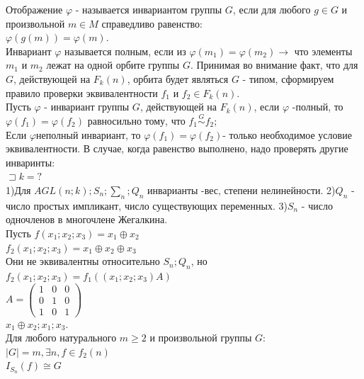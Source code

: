 \opr 
Отображение $\varphi$ - называется инвариантом группы $G$, если для любого $g \in G$ и произвольной $m \in M$ справедливо равенство:\\
$\varphi(g(m))=\varphi(m)$.\\
Инвариант $\varphi$ называется полным, если из $\varphi (m_1) = \varphi(m_2) \rightarrow $ что элементы $m_1 $ и $m_2$ лежат на одной орбите группы $G$. Принимая во внимание факт, что для $G$, действующей на $F_k(n)$, орбита будет являться $G$ - типом, сформируем правило проверки эквивалентности $f_1 $ и $f_2 \in F_k(n)$.\\
Пусть $\varphi$ - инвариант группы $G$, действующей на $F_k(n)$, если $\varphi$ -полный, то $\varphi(f_1)=\varphi(f_2) $ равносильно тому, что $f_1 \stackrel{G}{\sim} f_2$;\\
Если $\varphi$неполный инвариант, то $\varphi(f_1)=\varphi(f_2) $- только необходимое условие эквивалентности. В случае, когда равенство выполнено, надо проверять другие инваринты:\\

$\sqsupset k = ?$\\
1)Для $AGL(n;k); S_n; \sum_n; Q_n $ инварианты -вес, степени нелинейности.
2)$Q_n$ - число простых импликант, число существующих переменных.
3)$S_n$ - число одночленов в многочлене Жегалкина.\\


\example 
Пусть $f(x_1;x_2;x_3)=x_1\oplus x_2$\\
$f_2(x_1;x_2;x_3)=x_1 \oplus x_2 \oplus x_3$ \\
Они не эквивалентны относительно $S_n;Q_n$, но
$f_2(x_1;x_2;x_3)=f_1((x_1;x_2;x_3)A)$\\



$A=
\begin{pmatrix}
  1 & 0 & 0\\
  0 & 1 & 0\\
  1 & 0 & 1
  
  
\end{pmatrix}$\\

$x_1 \oplus x_2;x_1;x_3$.\\


\thr
Для любого натурального $ m \geqslant 2$ и произвольной группы $G$:
$|G|=m, \exists n ,f\in f_2(n)$\\
$I_{S_n}(f) \cong G$

 







